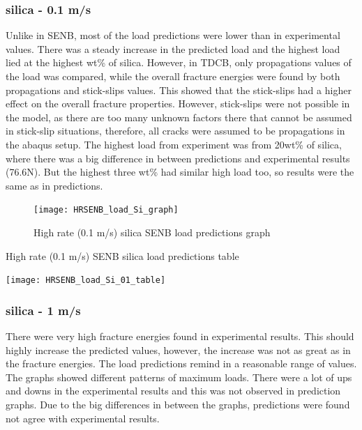 \documentclass[numbers=noendperiod,chapterprefix=on]{icldt} %
\begin{document}
\subsubsection{silica - 0.1 m/s}

Unlike in SENB, most of the load predictions were lower than in experimental values. There was a steady increase in the predicted load and the highest load lied at the highest wt\% of silica. However, in TDCB, only propagations values of the load was compared, while the overall fracture energies were found by both propagations and stick-slips values. This showed that the stick-slips had a higher effect on the overall fracture properties. However, stick-slips were not possible in the model, as there are too many unknown factors there that cannot be assumed in stick-slip situations, therefore, all cracks were assumed to be propagations in the abaqus setup.
The highest load from experiment was from 20wt\% of silica, where there was a big difference in between predictions and experimental results (76.6N). But the highest three wt\% had similar high load too, so results were the same as in predictions.

\begin{figure}[!hp]
   \centering
   \texttt{[image: HRSENB\_load\_Si\_graph]}\label{HRSENB_load_Si_graph}
   \caption{High rate (0.1 m/s) silica SENB load predictions graph}
   \end{figure}
  \FloatBarrier
  
  \begin{table}
     \centering
     \caption{High rate (0.1 m/s) SENB silica load predictions table}\label{HRSENB_load_Si_01_table}
     \texttt{[image: HRSENB\_load\_Si\_01\_table]}
     \end{table}
     \FloatBarrier      

\subsubsection{silica - 1 m/s}
There were very high fracture energies found in experimental results. This should highly increase the predicted values, however, the increase was not as great as in the fracture energies. The load predictions remind in a reasonable range of values. 
The graphs showed different patterns of maximum loads. There were a lot of ups and downs in the experimental results and this was not observed in prediction graphs.
Due to the big differences in between the graphs, predictions were found not agree with experimental results.
\end{document}
